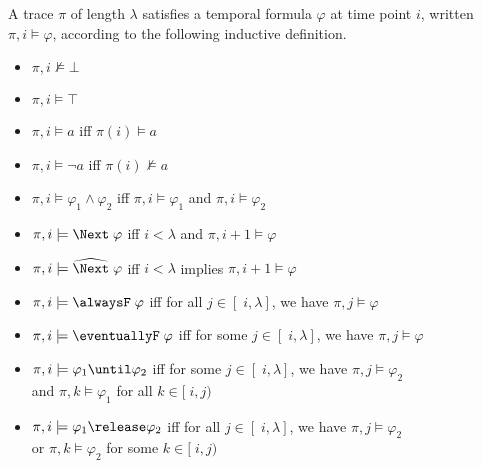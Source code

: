 \begin{definition}[Semantics]
    A trace $\pi$ of length $\lambda$ satisfies a temporal formula $\varphi$ at time point $i$, written $\pi,i \models\varphi$, according to the following inductive definition. 
    \begin{itemize}
      \item $\pi,i \not\models\bot$ \hspace{82px} 
      \item $\pi,i \models\top$ 
      
      \item $\pi,i\models a$ iff $\pi(i)\models a$ \hspace{30px} 
      \item $\pi,i\models \neg  a$ iff $\pi(i)\not\models a$
    
      \item $\pi,i \models\varphi_1 \wedge \varphi_2$ iff $\pi,i \models\varphi_1$ and $\pi,i \models\varphi_2$
      
      
      \item $\pi,i \models\Next \; \varphi$ iff $i<\lambda$ and $\pi,i+1 \models \varphi$
      
      \item $\pi,i \models\wnext \; \varphi$ iff $i<\lambda$ implies $\pi,i+1 \models \varphi$
      
      \item $\pi,i \models\alwaysF \; \varphi$ iff for all $j \in [\;i,\lambda]$, we have $\pi,j \models \varphi$
      
      \item $\pi,i \models\eventuallyF \; \varphi$ iff for some $j\in [\;i,\lambda]$, we have $\pi,j \models \varphi$
      
      \item $\pi,i \models\varphi_1 \until \varphi_2$ iff for some $j\in [\;i,\lambda]$, we have $\pi,j \models \varphi_2$ 
      \\\phantom{$\pi,i \models\varphi_1 \until \varphi_2$ iff for some $j\in [\;i,\lambda]$} 
      and $\pi,k \models \varphi_1$ for all $k\in [\;i,j)$
      
      \item $\pi,i \models\varphi_1 \release \varphi_2$ iff for all $j\in [\;i,\lambda]$, we have $\pi,j \models \varphi_2$ 
      \\\phantom{$\pi,i \models\varphi_1 \until \varphi_2$ iff for some $j\in [\;i,\lambda]$} 
        or $\pi,k \models \varphi_2$
      for some $k\in [\;i,j)$
    \end{itemize}
\end{definition}

